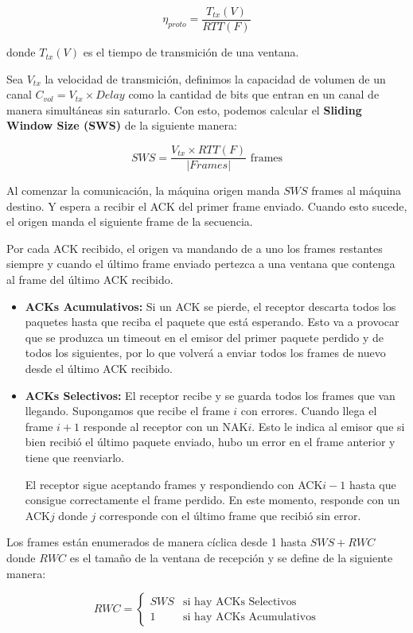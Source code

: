 \[\eta_{proto} = \frac{T_{tx}(V)}{RTT(F)}\]

donde \(T_{tx}(V)\) es el tiempo de transmición de una ventana.

Sea \(V_{tx}\) la velocidad de transmición, definimos la capacidad de volumen de un canal \(C_{vol} = V_{tx}\times Delay\) como la cantidad de bits que entran en un canal de manera simultáneas sin saturarlo. Con esto, podemos calcular el \textbf{Sliding Window Size (SWS)} de la siguiente manera:

\[SWS = \frac{V_{tx}\times RTT(F)}{|Frames|} \text{ frames}\]

Al comenzar la comunicación, la máquina origen manda \(SWS\) frames al máquina destino. Y espera a recibir el ACK del primer frame enviado. Cuando esto sucede, el origen manda el siguiente frame de la secuencia.

Por cada ACK recibido, el origen va mandando de a uno los frames restantes siempre y cuando el último frame enviado pertezca a una ventana que contenga al frame del último ACK recibido.

\begin{itemize}
  \item \textbf{ACKs Acumulativos:} Si un ACK se pierde, el receptor descarta todos los paquetes hasta que reciba el paquete que está esperando. Esto va a provocar que se produzca un timeout en el emisor del primer paquete perdido y de todos los siguientes, por lo que volverá a enviar todos los frames de nuevo desde el último ACK recibido.
  \item \textbf{ACKs Selectivos:} El receptor recibe y se guarda todos los frames que van llegando. Supongamos que recibe el frame \(i\) con errores. Cuando llega el frame \(i + 1\) responde al receptor con un NAK\(i\). Esto le indica al emisor que si bien recibió el último paquete enviado, hubo un error en el frame anterior y tiene que reenviarlo.
  
  El receptor sigue aceptando frames y respondiendo con ACK\(i-1\) hasta que consigue correctamente el frame perdido. En este momento, responde con un ACK\(j\) donde \(j\) corresponde con el último frame que recibió sin error.
\end{itemize}

Los frames están enumerados de manera cíclica desde 1 hasta \(SWS + RWC\) donde \(RWC\) es el tamaño de la ventana de recepción y se define de la siguiente manera:

\[
  RWC = \begin{cases}
    SWS & \text{si hay ACKs Selectivos} \\
    1 & \text{si hay ACKs Acumulativos}
  \end{cases}
\]

